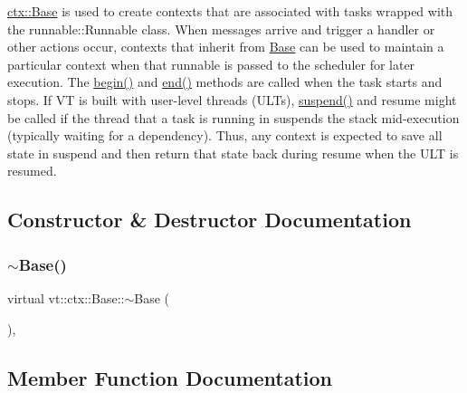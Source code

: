 {\ttfamily \hyperlink{structvt_1_1ctx_1_1_base}{ctx\+::\+Base}} is used to create contexts that are associated with tasks wrapped with the {\ttfamily runnable\+::\+Runnable} class. When messages arrive and trigger a handler or other actions occur, contexts that inherit from {\ttfamily \hyperlink{structvt_1_1ctx_1_1_base}{Base}} can be used to maintain a particular context when that runnable is passed to the scheduler for later execution. The {\ttfamily \hyperlink{structvt_1_1ctx_1_1_base_aab5524952e1bb163ccba5df64a303168}{begin()}} and {\ttfamily \hyperlink{structvt_1_1ctx_1_1_base_a113bac732b2831caa8eed11609ccaf0e}{end()}} methods are called when the task starts and stops. If VT is built with user-\/level threads (U\+L\+Ts), {\ttfamily \hyperlink{structvt_1_1ctx_1_1_base_a445badaaad72b44313084b2c95a13003}{suspend()}} and {\ttfamily resume} might be called if the thread that a task is running in suspends the stack mid-\/execution (typically waiting for a dependency). Thus, any context is expected to save all state in suspend and then return that state back during resume when the U\+LT is resumed. 

\subsection{Constructor \& Destructor Documentation}
\mbox{\label{structvt_1_1ctx_1_1_base_a11811118c1c91d93e7679610bf8377f2}} 
\subsubsection{\texorpdfstring{$\sim$\+Base()}{~Base()}}
{\footnotesize\ttfamily virtual vt\+::ctx\+::\+Base\+::$\sim$\+Base (\begin{DoxyParamCaption}{ }\end{DoxyParamCaption})\hspace{0.3cm}{\ttfamily [virtual]}, {\ttfamily [default]}}



\subsection{Member Function Documentation}
\mbox{\label{structvt_1_1ctx_1_1_base_aab5524952e1bb163ccba5df64a303168}} 
